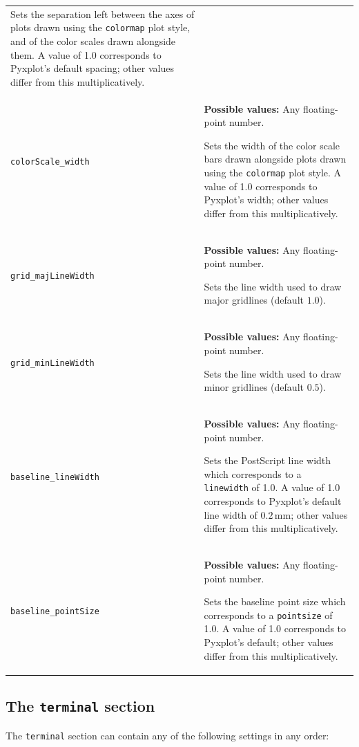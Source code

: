 \begin{longtable}{p{3.4cm}p{9cm}}
               Sets the separation left between the axes of plots drawn using the {\tt colormap} plot style, and of the color scales drawn alongside them. A value of 1.0 corresponds to Pyxplot's default spacing; other values differ from this multiplicatively.
               \\
{\tt colorScale\_width} & {\bf Possible values:} Any floating-point number.

               Sets the width of the color scale bars drawn alongside plots drawn using the {\tt colormap} plot style. A value of 1.0 corresponds to Pyxplot's width; other values differ from this multiplicatively.
               \\
{\tt grid\_majLineWidth} & {\bf Possible values:} Any floating-point number.

               Sets the line width used to draw major gridlines (default $1.0$).
               \\
{\tt grid\_minLineWidth} & {\bf Possible values:} Any floating-point number.

               Sets the line width used to draw minor gridlines (default $0.5$).
               \\
{\tt baseline\_lineWidth} & {\bf Possible values:} Any floating-point number.

               Sets the PostScript line width which corresponds to a {\tt linewidth} of 1.0. A value of 1.0 corresponds to Pyxplot's default line width of $0.2\,\mathrm{mm}$; other values differ from this multiplicatively.
               \\
{\tt baseline\_pointSize} & {\bf Possible values:} Any floating-point number.

               Sets the baseline point size which corresponds to a {\tt pointsize} of 1.0. A value of 1.0 corresponds to Pyxplot's default; other values differ from this multiplicatively.
               \\
\end{longtable}

\subsection{The {\tt terminal} section}
\label{sec:configfile_terminal}

The {\tt terminal} section can contain any of the following settings in any order:


